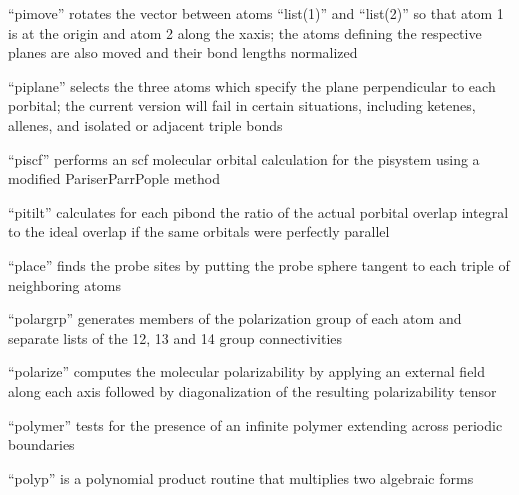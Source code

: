 \documentclass[letterpaper,11pt,english]{sphinxmanual}
\begin{document}

“pimove” rotates the vector between atoms “list(1)” and “list(2)” so that atom 1 is at the origin and atom 2 along the x\sphinxhyphen{}axis; the atoms defining the respective planes are also moved and their bond lengths normalized


“piplane” selects the three atoms which specify the plane perpendicular to each p\sphinxhyphen{}orbital; the current version will fail in certain situations, including ketenes, allenes, and isolated or adjacent triple bonds


“piscf” performs an scf molecular orbital calculation for the pisystem using a modified Pariser\sphinxhyphen{}Parr\sphinxhyphen{}Pople method


“pitilt” calculates for each pibond the ratio of the actual p\sphinxhyphen{}orbital overlap integral to the ideal overlap if the same orbitals were perfectly parallel


“place” finds the probe sites by putting the probe sphere tangent to each triple of neighboring atoms


“polargrp” generates members of the polarization group of each atom and separate lists of the 1\sphinxhyphen{}2, 1\sphinxhyphen{}3 and 1\sphinxhyphen{}4 group connectivities


“polarize” computes the molecular polarizability by applying an external field along each axis followed by diagonalization of the resulting polarizability tensor


“polymer” tests for the presence of an infinite polymer extending across periodic boundaries


“polyp” is a polynomial product routine that multiplies two algebraic forms


\end{document}
